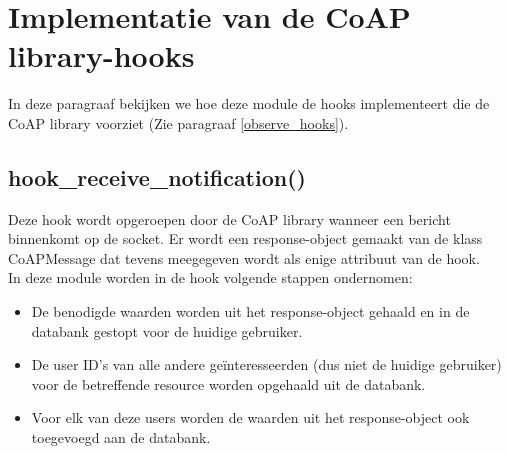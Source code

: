 
\section{Implementatie van de CoAP library-hooks}
In deze paragraaf bekijken we hoe deze module de hooks implementeert die de CoAP library voorziet (Zie paragraaf \ref{observe_hooks}).

\subsection{hook\_receive\_notification()}
Deze hook wordt opgeroepen door de CoAP library wanneer een bericht binnenkomt op de socket. Er wordt een response-object gemaakt van de klass CoAPMessage dat tevens meegegeven wordt als enige attribuut van de hook.\\
In deze module worden in de hook volgende stappen ondernomen:
\begin{itemize}
\item De benodigde waarden worden uit het response-object gehaald en in de databank gestopt voor de huidige gebruiker.
\item De user ID's van alle andere ge\"{i}nteresseerden (dus niet de huidige gebruiker) voor de betreffende resource worden opgehaald uit de databank.
\item Voor elk van deze users worden de waarden uit het response-object ook toegevoegd aan de databank.
\end{itemize}

